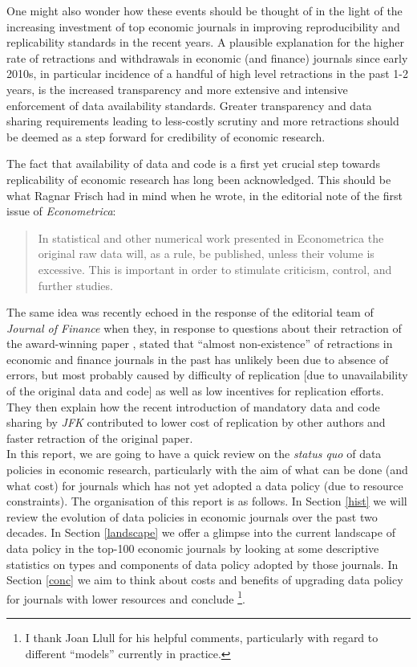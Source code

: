 \documentclass[11pt]{article}
\begin{document}
One might also wonder how these events should be thought of in the light of the increasing investment of top economic journals in improving reproducibility and replicability standards in the recent years. A plausible explanation for the higher rate of retractions and withdrawals in economic (and finance) journals since early 2010s, in particular incidence of a handful of high level retractions in the past 1-2 years, is the increased transparency and more extensive and intensive enforcement of data availability standards. Greater transparency and data sharing requirements leading to less-costly scrutiny and more retractions should be deemed as a step forward for credibility of economic research.

The fact that availability of data and code is a first yet crucial step towards replicability of economic research has long been acknowledged. This should be what Ragnar Frisch had in mind when he wrote, in the editorial note of the first issue of \textit{Econometrica}:
\begin{quotation}
	In statistical and other numerical work presented in Econometrica the
	original raw data will, as a rule, be published, unless their volume is
	excessive. This is important in order to stimulate criticism, control,
	and further studies. \cite{frisch1933editor}
\end{quotation}
The same idea was recently echoed in the response of the editorial team of \textit{Journal of Finance} when they, in response to questions about their retraction of the award-winning paper \cite{rampini2020retracted}, stated that ``almost non-existence'' of retractions in economic and finance journals in the past has unlikely been due to absence of errors, but most probably caused by difficulty of replication [due to unavailability of the original data and code] as well as low incentives for replication efforts. They then explain how the recent introduction of mandatory data and code sharing by \textit{JFK} contributed to lower cost of replication by other authors and faster retraction of the original paper.\\


In this report, we are going to have a quick review on the \textit{status quo} of data policies in economic research, particularly with the aim of what can be done (and what cost) for journals which has not yet adopted a data policy (due to resource constraints). The organisation of this report is as follows. In Section \ref{hist} we will review the evolution of data policies in economic journals over the past two decades. In Section \ref{landscape} we offer a glimpse into the current landscape of data policy in the top-100 economic journals by looking at some descriptive statistics on types and components of data policy adopted by those journals. In Section \ref{conc} we aim to think about costs and benefits of upgrading data policy for journals with lower resources and conclude \footnote{I thank Joan Llull for his helpful comments, particularly with regard to different ``models'' currently in practice.}.
\end{document}

